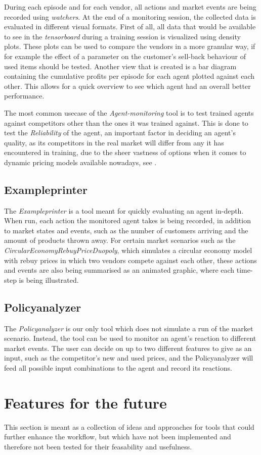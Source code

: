 During each episode and for each vendor, all actions and market events are being recorded using \emph{watchers}. At the end of a monitoring session, the collected data is evaluated in different visual formats. First of all, all data that would be available to see in the \emph{tensorboard} during a training session is visualized using density plots. These plots can be used to compare the vendors in a more granular way, if for example the effect of a parameter on the customer's sell-back behaviour of used items should be tested. Another view that is created is a bar diagram containing the cumulative profits per episode for each agent plotted against each other. This allows for a quick overview to see which agent had an overall better performance.

The most common usecase of the \emph{Agent-monitoring} tool is to test trained agents against competitors other than the ones it was trained against. This is done to test the \emph{Reliability} of the agent, an important factor in deciding an agent's quality, as its competitors in the real market will differ from any it has encountered in training, due to the sheer vastness of options when it comes to dynamic pricing models available nowadays, see .

\subsection*{Exampleprinter}

The \emph{Exampleprinter} is a tool meant for quickly evaluating an agent in-depth. When run, each action the monitored agent takes is being recorded, in addition to market states and events, such as the number of customers arriving and the amount of products thrown away. For certain market scenarios such as the \emph{CircularEconomyRebuyPriceDuopoly}, which simulates a circular economy model with rebuy prices in which two vendors compete against each other, these actions and events are also being summarised as an animated graphic, where each time-step is being illustrated. 

\subsection*{Policyanalyzer}

The \emph{Policyanalyzer} is our only tool which does not simulate a run of the market scenario. Instead, the tool can be used to monitor an agent's reaction to different market events. The user can decide on up to two different features to give as an input, such as the competitor's new and used prices, and the Policyanalyzer will feed all possible input combinations to the agent and record its reactions. 

\section{Features for the future}

This section is meant as a collection of ideas and approaches for tools that could further enhance the workflow, but which have not been implemented and therefore not been tested for their feasability and usefulness.